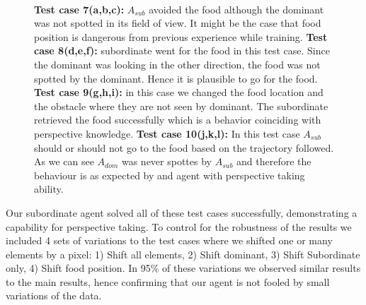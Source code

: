 \documentclass{article}
\begin{document}
\begin{figure}[H]
\begin{center}
\\
\caption{\textbf {Test  case 7(a,b,c):} \(A_{sub}\) avoided the food although the dominant was not spotted in its field of view. It might be the case that food position is dangerous from previous experience while training. \textbf{Test  case 8(d,e,f):} subordinate went for the food in this test case. Since the dominant was looking in the other direction, the food was not spotted by the dominant. Hence it is plausible to go for the food. \textbf{Test  case 9(g,h,i):} in this case we changed the food location and the obstacle where they are not seen by dominant. The subordinate retrieved the food successfully which is a behavior coinciding with perspective knowledge. \textbf{Test  case 10(j,k,l):} In this test case \(A_{sub}\) should or should not go to the food based on the trajectory followed. As we can see \(A_{dom}\) was never spottes by \(A_{sub}\) and therefore the behaviour is as expected by and agent with perspective taking ability.}
\label{fig.tc.7}
\label{fig.tc.8}
\label{fig.tc.9}
\label{fig.tc.10}
\end{center}
\end{figure}

\restoregeometry

Our subordinate agent solved all of these test cases successfully, demonstrating a capability for perspective taking. To control for the robustness of the results we included 4 sets of variations to the test cases where we shifted one or many elements by a pixel: 1) Shift all elements, 2) Shift dominant, 3) Shift Subordinate only, 4) Shift food position. In 95\% of these variations we observed similar results to the main results, hence confirming that our agent is not fooled by small variations of the data.
\end{document}

